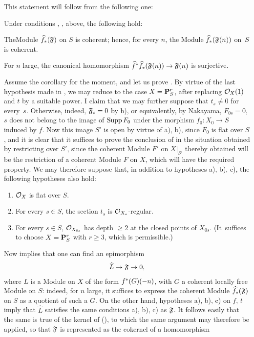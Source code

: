 This statement will follow from the following one:

\begin{corollaire} \label{XII.3.2}
Under conditions , ,  above, the following hold:
\begin{enumeratei}
\item
The\pageoriginale Module $\widehat{f}_\ast(\formelF)$ on $S$ is coherent; hence, for every $n$, the Module $\widehat{f}_\ast(\formelF(n))$ on~$S$ is coherent.
\item
For $n$ large, the canonical homomorphism $\widehat{f}^\ast\widehat{f}_\ast(\formelF(n))\to \formelF(n)$ is surjective.
\end{enumeratei}
\end{corollaire}

Assume the corollary for the moment, and let us prove . By virtue of the last hypothesis made in , we may reduce to the case $X=\PP^r_S$, after replacing $\OX(1)$ and $t$ by a suitable power. I claim that we may further suppose that $t_s\neq 0$ for every~$s$. Otherwise, indeed, $\formelF_s=0$ by b), or equivalently, by Nakayama, $F_{0s}=0$, \ie $s$ does not belong to the image of $\Supp F_0$ under the morphism $f_0:X_0\to S$ induced by $f$. Now this image $S'$ is open by virtue of a), b), since $F_0$ is flat over $S$, and it is clear that it suffices to prove the conclusion of  in the situation obtained by restricting over $S'$, since the coherent Module $F'$ on $X|_{S'}$ thereby obtained will be the restriction of a coherent Module $F$ on $X$, which will have the required property. We may therefore suppose that, in addition to hypotheses a), b), c), the following hypotheses also hold:
\begin{enumerate}
\item[\textup{a$'$)}] $\OX$ is flat over $S$.
\item[\textup{b$'$)}] For every $s\in S$, the section $t_s$ is $\Oo_{X_s}$-regular.
\item[\textup{c$'$)}] For every $s\in S$, $\Oo_{X_{0s}}$ has depth $\geq 2$ at the closed points of $X_{0s}$. (It~suffices to choose $X=\PP_S^r$ with $r\geq 3$, which is permissible.)
\end{enumerate}
Now  implies that one can find an epimorphism
\steco
\begin{equation} \label{eq:XII.17}
\widehat{L} \to \formelF \to 0,
\end{equation}
where $L$ is a Module on $X$ of the form $\sisi{f_\ast(G)}{f^\ast(G)}(-n)$, with $G$ a coherent locally free Module on $S$: indeed, for $n$ large, it suffices to express the coherent Module $\widehat{f}_\ast(\formelF)$ on $S$ as a quotient of such a $G$. On the other hand, hypotheses a), b), c) on $f$, $t$ imply that $\widehat{L}$ satisfies the same conditions a), b), c) as $\formelF$. It follows easily that the same is true of the kernel of (), to which the same argument may therefore be applied, so that $\formelF$ is represented as the cokernel of a homomorphism
